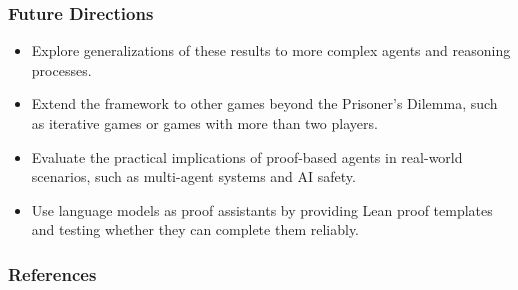 \documentclass[t,11pt]{beamer}
\begin{document}
\begin{frame}
  \frametitle{Future Directions}

  \begin{itemize}
    \item Explore generalizations of these results to more complex agents and reasoning processes.
    \vspace{0.2cm}
    \item Extend the framework to other games beyond the Prisoner's Dilemma, such as iterative games or games with more than two players.
    \vspace{0.2cm}
    \item Evaluate the practical implications of proof-based agents in real-world scenarios, such as multi-agent systems and AI safety.
    \vspace{0.2cm}
    \item Use language models as proof assistants by providing Lean proof templates and testing whether they can complete them reliably.
  \end{itemize}
\end{frame}



\begin{frame}[allowframebreaks]
  \frametitle{References}
  \printbibliography
\end{frame}
\end{document}
